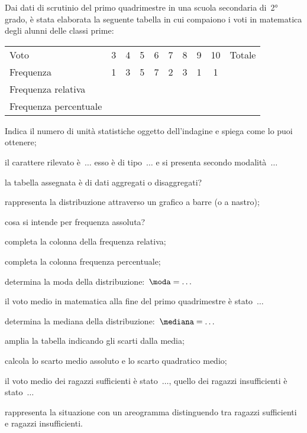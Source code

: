 \begin{esercizio}
\label{ese:A.47}
Dai dati di scrutinio del primo quadrimestre in una scuola secondaria di~2° 
grado, è stata elaborata la seguente tabella in cui compaiono i voti in 
matematica degli alunni delle classi prime:
\begin{center}
\begin{tabular}{l*{9}{c}}
\toprule
Voto&3 &4 &5 &6 &7 &8 &9 &10 &Totale\\
Frequenza &1&3&5&7&2&3&1&1&\\
Frequenza relativa&&&&&&&&&\\
Frequenza percentuale&&&&&&&&&\\
\bottomrule
\end{tabular}
\end{center}
\begin{enumeratea}
 \item Indica il numero di unità statistiche oggetto dell'indagine e spiega 
come lo puoi ottenere;
 \item il carattere rilevato è~$\dots$ esso è di tipo~$\dots$ e si presenta 
secondo modalità~$\dots$
 \item la tabella assegnata è di dati aggregati o disaggregati?
 \item rappresenta la distribuzione attraverso un grafico a barre (o a 
nastro);
 \item cosa si intende per frequenza assoluta?
 \item completa la colonna della frequenza relativa;
 \item completa la colonna frequenza percentuale;
 \item determina la moda della distribuzione:~$\moda = \dots$
 \item il voto medio in matematica alla fine del primo quadrimestre è 
stato~$\dots$
 \item determina la mediana della distribuzione:~$\mediana= \dots$
 \item amplia la tabella indicando gli scarti dalla media;
 \item calcola lo scarto medio assoluto e lo scarto quadratico medio;
 \item il voto medio dei ragazzi sufficienti è stato~$\dots$, quello dei 
ragazzi insufficienti è stato~$\dots$
 \item rappresenta la situazione con un areogramma distinguendo tra ragazzi 
sufficienti e ragazzi insufficienti.
 \end{enumeratea}
\end{esercizio}


